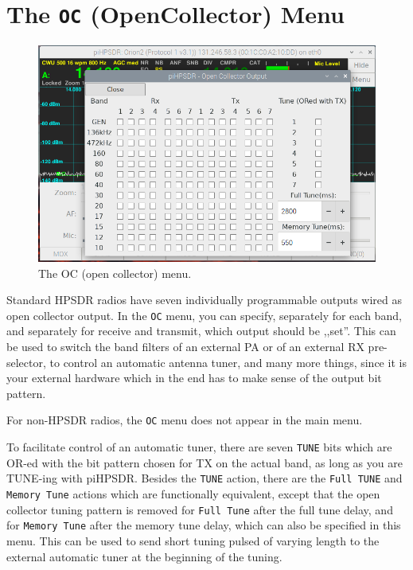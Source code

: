 \documentclass[12pt]{book}
\def\rett#1{\texttt{\color{red}#1}}
\def\bltt#1{\texttt{\color{blue}#1}}
\def\pH{pi\-HPSDR\xspace}
\begin{document}
\section{The \texttt{OC} (OpenCollector) Menu}

\begin{figure}[ht]
\center
\includegraphics[width=12cm]{OCMenu.png}
\caption{The OC (open collector) menu.}
\label{fig:OCMenu}
\end{figure}

Standard HPSDR radios have seven individually programmable outputs wired as
open collector output. In the \bltt{OC} menu, you can specify, separately
for each band, and separately for receive and transmit, which output should
be ,,set''. This can be used to switch the band filters of an external PA
or of an external RX pre-selector, to control an automatic antenna tuner,
and many more things, since it is
your external hardware which in the end has to make sense of the output
bit pattern.

For non-HPSDR radios, the \bltt{OC} menu does not appear in the main menu.

To facilitate control of an automatic tuner, there are seven \rett{TUNE}
bits which are OR-ed with the bit pattern chosen for TX on the actual band,
as long as you are TUNE-ing with \pH. Besides the \bltt{TUNE} action,
there are the \bltt{Full TUNE} and \bltt{Memory Tune} actions which are
functionally equivalent, except that the open collector tuning pattern
is removed for \bltt{Full Tune} after the full tune delay, and for \bltt{Memory Tune}
after the memory tune delay, which can also be specified in this menu.
This can be used to send short tuning pulsed of varying length to the
external automatic tuner at the beginning of the tuning.
\end{document}
